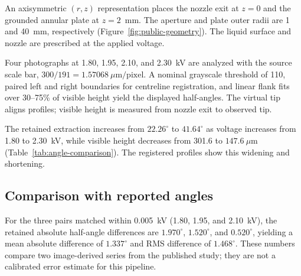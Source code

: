 An axisymmetric $(r,z)$ representation places the nozzle exit at $z=0$ and the grounded annular plate at $z=2$~mm. The aperture and plate outer radii are 1 and 40~mm, respectively (Figure~\ref{fig:public-geometry}). The liquid surface and nozzle are prescribed at the applied voltage.

Four photographs at 1.80, 1.95, 2.10, and 2.30~kV are analyzed with the source scale bar, $300/191=1.57068~\mu\mathrm{m/pixel}$. A nominal grayscale threshold of 110, paired left and right boundaries for centreline registration, and linear flank fits over 30--75\% of visible height yield the displayed half-angles. The virtual tip aligns profiles; visible height is measured from nozzle exit to observed tip.

The retained extraction increases from $22.26^\circ$ to $41.64^\circ$ as voltage increases from 1.80 to 2.30~kV, while visible height decreases from 301.6 to $147.6~\mu$m (Table~\ref{tab:angle-comparison}). The registered profiles show this widening and shortening.

\subsection{Comparison with reported angles}
For the three pairs matched within 0.005~kV (1.80, 1.95, and 2.10~kV), the retained absolute half-angle differences are $1.970^\circ$, $1.520^\circ$, and $0.520^\circ$, yielding a mean absolute difference of $1.337^\circ$ and RMS difference of $1.468^\circ$. These numbers compare two image-derived series from the published study; they are not a calibrated error estimate for this pipeline.

